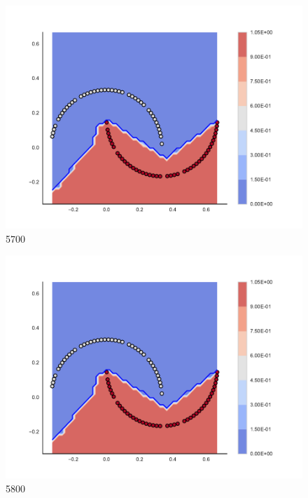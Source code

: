 \begin{subfigure}[b]{0.09\textwidth}
    \includegraphics[clip, trim=2.35cm 1.75cm 4.5cm 0cm,width=\textwidth]{img/convergence/5700.pdf}
    \caption{5700}
    \label{fig:convergence_5700}
\end{subfigure}
%
\begin{subfigure}[b]{0.09\textwidth}
    \includegraphics[clip, trim=2.35cm 1.75cm 4.5cm 0cm,width=\textwidth]{img/convergence/5800.pdf}
    \caption{5800}
    \label{fig:convergence_5800}
\end{subfigure}
%
